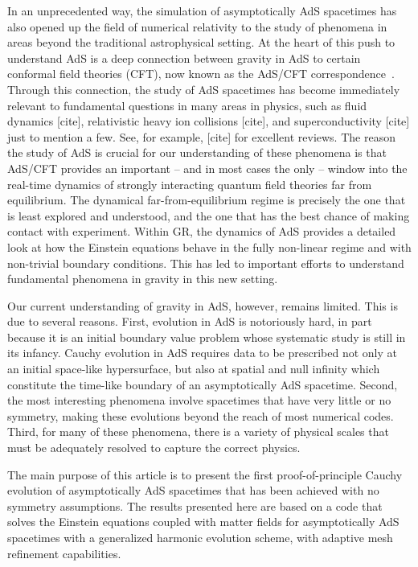 \documentclass[a4paper,11pt]{article}
\numberwithin{equation}{section}
\begin{document}
In an unprecedented way, the simulation of asymptotically AdS spacetimes has also opened up the field of numerical relativity to the study of phenomena in areas beyond the traditional astrophysical setting. 
At the heart of this push to understand AdS is a deep connection between gravity in AdS to certain conformal field theories (CFT), now known as the AdS/CFT correspondence~\cite{Maldacena:1997re,Gubser:1998bc,Witten:1998qj}. 
Through this connection, the study of AdS spacetimes has become immediately relevant to fundamental questions in many areas in physics, such as fluid dynamics [cite], relativistic heavy ion collisions [cite], and superconductivity [cite] just to mention a few.
See, for example, [cite] for excellent reviews. 
The reason the study of AdS is crucial for our understanding of these phenomena is that AdS/CFT provides an important -- and in most cases the only -- window into the real-time dynamics of strongly interacting quantum field theories far from equilibrium. 
The dynamical far-from-equilibrium regime is precisely the one that is least explored and understood, and the one that has the best chance of making contact with experiment.
Within GR, the dynamics of AdS provides a detailed look at how the Einstein equations behave in the fully non-linear regime and with non-trivial boundary conditions.
This has led to important efforts to understand fundamental phenomena in gravity in this new setting.%

Our current understanding of gravity in AdS, however, remains limited. 
This is due to several reasons.
First, evolution in AdS is notoriously hard, in part because it is an initial boundary value problem whose systematic study is still in its infancy. 
Cauchy evolution in AdS requires data to be prescribed not only at an initial space-like hypersurface, but also at spatial and null infinity which constitute the time-like boundary of an asymptotically AdS spacetime.
Second, the most interesting phenomena involve spacetimes that have very little or no symmetry, making these evolutions beyond the reach of most numerical codes. 
Third, for many of these phenomena, there is a variety of physical scales that must be adequately resolved to capture the correct physics.

The main purpose of this article is to present the first proof-of-principle Cauchy evolution of asymptotically AdS spacetimes that has been achieved with no symmetry assumptions.
The results presented here are based on a code that solves the Einstein equations coupled with matter fields for asymptotically AdS spacetimes with a generalized harmonic evolution scheme, with adaptive mesh refinement capabilities. 
\end{document}
